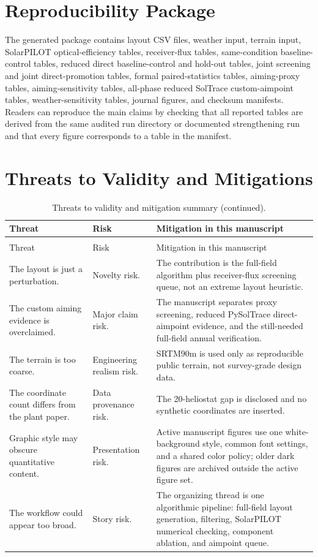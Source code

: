 \documentclass[final,3p,times]{elsarticle}
\begin{document}
\section{Reproducibility Package}
The generated package contains layout CSV files, weather input, terrain input, SolarPILOT optical-efficiency tables, receiver-flux tables, same-condition baseline-control tables, reduced direct baseline-control and hold-out tables, joint screening and joint direct-promotion tables, formal paired-statistics tables, aiming-proxy tables, aiming-sensitivity tables, all-phase reduced SolTrace custom-aimpoint tables, weather-sensitivity tables, journal figures, and checksum manifests. Readers can reproduce the main claims by checking that all reported tables are derived from the same audited run directory or documented strengthening run and that every figure corresponds to a table in the manifest.

\section{Threats to Validity and Mitigations}
\begin{longtable}{p{}p{}p{}}
\caption{Threats to validity and mitigation summary.} \label{tab:threats-validity}\\
\toprule
Threat & Risk & Mitigation in this manuscript \\
\midrule
\endfirsthead
\caption[]{Threats to validity and mitigation summary (continued).}\\
\toprule
Threat & Risk & Mitigation in this manuscript \\
\midrule
\endhead
The layout is just a perturbation. & Novelty risk. & The contribution is the full-field algorithm plus receiver-flux screening queue, not an extreme layout heuristic. \\
The custom aiming evidence is overclaimed. & Major claim risk. & The manuscript separates proxy screening, reduced PySolTrace direct-aimpoint evidence, and the still-needed full-field annual verification. \\
The terrain is too coarse. & Engineering realism risk. & SRTM90m is used only as reproducible public terrain, not survey-grade design data. \\
The coordinate count differs from the plant paper. & Data provenance risk. & The 20-heliostat gap is disclosed and no synthetic coordinates are inserted. \\
Graphic style may obscure quantitative content. & Presentation risk. & Active manuscript figures use one white-background style, common font settings, and a shared color policy; older dark figures are archived outside the active figure set. \\
The workflow could appear too broad. & Story risk. & The organizing thread is one algorithmic pipeline: full-field layout generation, filtering, SolarPILOT numerical checking, component ablation, and aimpoint queue. \\
\bottomrule
\end{longtable}
\end{document}
